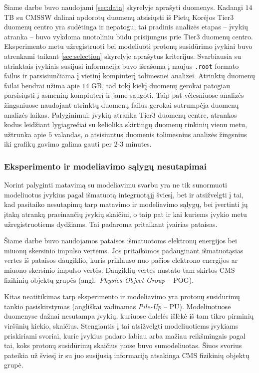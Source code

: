\documentclass[a4paper, 12pt]{article}
\newcommand{\ttt}[1]{\texttt{#1}}
\begin{document}
Šiame darbe buvo naudojami \ref{sec:data} skyrelyje aprašyti duomenys.
Kadangi $14$ TB su CMSSW dalinai apdorotų duomenų atsisiųsti iš Pietų Korėjos Tier3 duomenų centro yra sudėtinga ir nepatogu,
tai pradinis analizės etapas -- įvykių atranka -- buvo vykdoma nuotoliniu būdu prisijungus prie Tier3 duomenų centro.
Eksperimento metu užregistruoti bei modeliuoti protonų susidūrimo įvykiai buvo atrenkami taikant \ref{sec:selection}
skyrelyje aprašytus kriterijus.
Svarbiausia su atrinktais įvykiais susijusi informacija buvo išrašoma į naujus \ttt{.root} formato failus ir parsisiunčiama
į vietinį kompiuterį tolimesnei analizei.
Atrinktų duomenų failai bendrai užima apie $14$ GB, tad tokį kiekį duomenų gerokai patogiau parsisiųsti į asmeninį kompiuterį
ir jame saugoti.
Taip pat vėlesniuose analizės žingsniuose naudojant atrinktų duomenų failus gerokai sutrumpėja duomenų analizės laikas.
Palyginimui: įvykių atranka Tier3 duomenų centre, atrankos kodus leidžiant lygiagrečiai su keliolika skirtingų duomenų rinkinių
vienu metu, užtrunka apie $5$ valandas, o atsisiuntus duomenis tolimesnius analizės žingsnius iki grafikų gavimo galima gauti
per $2$-$3$ minutes.

\subsubsection{Eksperimento ir modeliavimo sąlygų nesutapimai}\label{sec:SFs}

Norint palyginti matavimą su modeliavimu svarbu yra ne tik sunormuoti modeliuotus įvykius pagal išmatuotą integruotąjį šviesį,
bet ir atsižvelgti į tai, kad pasitaiko nesutapimų tarp matavimo ir modeliavimo sąlygų, bei įvertinti jų įtaką atranką praeinančių
įvykių skaičiui, o taip pat ir kai kuriems įvykio metu užregistruotiems dydžiams.
Tai padaroma pritaikant įvairias pataisas.

Šiame darbe buvo naudojamos pataisos išmatuotoms elektronų energijos bei miuonų skersinio impulso vertėms.
Jos pritaikomos padauginant išmatuotąsias vertes iš pataisos daugiklio, kuris priklauso nuo pačios elektrono energijos ar miuono
skersinio impulso vertės.
Daugiklių vertes nustato tam skirtos CMS fizikinių objektų grupės (angl.\ \textit{Physics Object Group} -- POG).

Kitas neatitikimas tarp eksperimento ir modeliavimo yra protonų susidūrimų tankio pasiskirstymas (angliškai vadinamas
\textit{Pile-Up} -- PU).
Modeliuotuose duomenyse dažnai nesutampa įvykių, kuriuose dalelės išlėkė iš tam tikro pirminių viršūnių kiekio, skaičius.
Stengiantis į tai atsižvelgti modeliuotiems įvykiams priskiriami svoriai, kurie įvykius padaro labiau arba mažiau reikšmingais
pagal tai, koks protonų susidūrimų skaičius juose buvo sumodeliuotas.
Šiuos svorius pateikia už šviesį ir su juo susijusią informaciją atsakinga CMS fizikinių objektų grupė.
\end{document}
